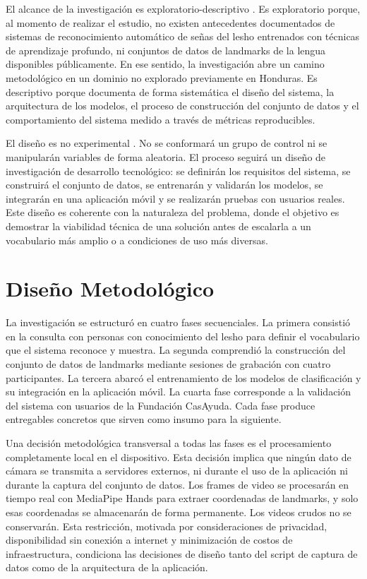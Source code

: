 El alcance de la investigación es exploratorio-descriptivo \cite{sampieri_metodologia_2014}.
Es exploratorio porque, al momento de realizar el estudio, no existen antecedentes
documentados de sistemas de reconocimiento automático de señas del \acrshort{lesho} entrenados
con técnicas de aprendizaje profundo, ni conjuntos de datos de landmarks de la lengua
disponibles públicamente. En ese sentido, la investigación abre un camino metodológico
en un dominio no explorado previamente en Honduras. Es descriptivo porque documenta de
forma sistemática el diseño del sistema, la arquitectura de los modelos, el proceso de
construcción del conjunto de datos y el comportamiento del sistema medido a través de
métricas reproducibles.

El diseño es no experimental \cite{sampieri_metodologia_2014}. No se conformará un grupo
de control ni se manipularán variables de forma aleatoria. El proceso seguirá un diseño de
investigación de desarrollo tecnológico: se definirán los requisitos del sistema, se
construirá el conjunto de datos, se entrenarán y validarán los modelos, se integrarán en una
aplicación móvil y se realizarán pruebas con usuarios reales. Este diseño es coherente con
la naturaleza del problema, donde el objetivo es demostrar la viabilidad técnica de una
solución antes de escalarla a un vocabulario más amplio o a condiciones de uso más
diversas.

\section{Diseño Metodológico}

La investigación se estructuró en cuatro fases secuenciales. La primera consistió en la
consulta con personas con conocimiento del \acrshort{lesho} para definir el vocabulario que el
sistema reconoce y muestra. La segunda comprendió la construcción del conjunto de datos
de landmarks mediante sesiones de grabación con cuatro participantes. La tercera abarcó
el entrenamiento de los modelos de clasificación y su integración en la aplicación móvil.
La cuarta fase corresponde a la validación del sistema con usuarios de la Fundación
CasAyuda. Cada fase produce entregables concretos que sirven como insumo para la
siguiente.

Una decisión metodológica transversal a todas las fases es el procesamiento
completamente local en el dispositivo. Esta decisión implica que ningún dato de cámara
se transmita a servidores externos, ni durante el uso de la aplicación ni durante la
captura del conjunto de datos. Los frames de video se procesarán en tiempo real con
MediaPipe Hands para extraer coordenadas de landmarks, y solo esas coordenadas se
almacenarán de forma permanente. Los videos crudos no se conservarán. Esta restricción,
motivada por consideraciones de privacidad, disponibilidad sin conexión a internet y
minimización de costos de infraestructura, condiciona las decisiones de diseño tanto del
script de captura de datos como de la arquitectura de la aplicación.

